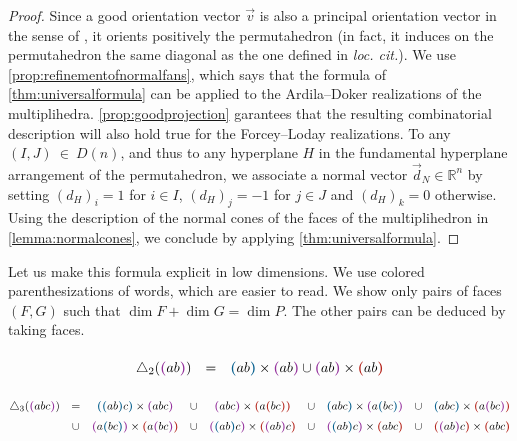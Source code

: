 \documentclass[twoside, 12pt]{amsart}
\theoremstyle{remark}
\newcommand{\RR}{\mathbb{R}}
\newcommand{\blue}[1]{\textcolor{MidnightBlue}{\textbf{(}} #1 \textcolor{MidnightBlue}{\textbf{)}}}
\newcommand{\red}[1]{\textcolor{BrickRed}{\textbf{(}} #1 \textcolor{BrickRed}{\textbf{)}}}
\newcommand{\purple}[1]{\textcolor{Purple}{\textbf{(}} #1 \textcolor{Purple}{\textbf{)}}}
\begin{document}
\begin{proof}
Since a good orientation vector $\vec v$ is also a principal orientation vector in the sense of \cite[Definition 3.15]{LA21}, it orients positively the permutahedron (in fact, it induces on the permutahedron the same diagonal as the one defined in \emph{loc. cit.}). 
We use \cref{prop:refinementofnormalfans}, which says that the formula of \cref{thm:universalformula} can be applied to the Ardila--Doker realizations of the multiplihedra. 
\cref{prop:goodprojection} garantees that the resulting combinatorial description will also hold true for the Forcey--Loday realizations.
To any~$(I,J)~\in~D(n)$, and thus to any hyperplane $H$ in the fundamental hyperplane arrangement of the permutahedron, we associate a normal vector $\vec d_N \in \RR^n$ by setting $(d_H)_i=1$ for $i\in I$, $(d_H)_j =-1$ for $j \in J$ and $(d_H)_k=0$ otherwise. 
Using the description of the normal cones of the faces of the multiplihedron in \cref{lemma:normalcones}, we conclude by applying \cref{thm:universalformula}.
\end{proof}

Let us make this formula explicit in low dimensions. We use colored parenthesizations of words, which are easier to read. We show only pairs of faces $(F,G)$ such that $\dim F + \dim G = \dim P$. The other pairs can be deduced by taking faces.

\begin{equation*}
  \begin{matrix}
      \triangle_2(\purple{ab}) & = & \blue{ab} \times \purple{ab} \cup \purple{ab} \times \red{ab}
  \end{matrix}
\end{equation*}

\begin{equation*}
  \renewcommand*{\arraystretch}{1.5}
  \begin{matrix}
      \triangle_3(\purple{abc}) 
      & = & \blue{\blue{ab} c} \times \purple{abc} & \cup & \purple{abc} \times \red{a \red{bc}}
      & \cup & \blue{abc} \times \purple{a \blue{bc}} & \cup & \blue{abc} \times \red{a \purple{bc}}  \\
      & \cup & \purple{a \blue{bc}} \times \red{a \purple{bc}} & \cup & \purple{\blue{ab} c} \times \red{\purple{ab} c} 
      & \cup & \purple{\blue{ab} c} \times \red{abc} & \cup & \red{\purple{ab} c} \times \red{abc} \\
  \end{matrix}
\end{equation*}
\end{document}
